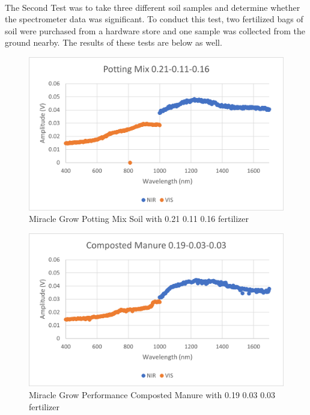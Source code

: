 \paragraph{} The Second Test was to take three different soil samples and determine whether the spectrometer data was significant. To conduct this test, two fertilized bags of soil were purchased from a hardware store and one sample was collected from the ground nearby. The results of these tests are below as well.

\begin{figure}[H]
    \caption{Miracle Grow Potting Mix Soil with 0.21 0.11 0.16 fertilizer}
    \centering
    \includegraphics[scale=0.5]{images/Data1.png}
\end{figure}

\begin{figure}[H]
    \caption{Miracle Grow Performance Composted Manure with 0.19 0.03 0.03 fertilizer}
    \centering
    \includegraphics[scale=0.5]{images/Data2.png}
\end{figure}

